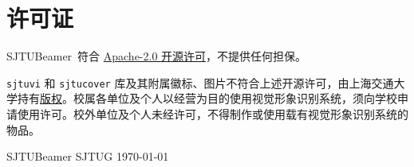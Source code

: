 \documentclass[
    UTF8,
    heading=true,
    12pt,
    a4paper
]{ctexrep}
\def\themename{\textsf{SJTUBeamer}}
\begin{document}
\chapter*{许可证}

\themename\ 符合 \href{https://github.com/sjtug/SJTUBeamer/blob/main/LICENSE}{Apache-2.0 开源许可}，不提供任何担保。

\texttt{sjtuvi} 和 \texttt{sjtucover} 库及其附属徽标、图片不符合上述开源许可，由上海交通大学持有\href{https://vi.sjtu.edu.cn/index.php/articles/bulletin/16}{版权}。校属各单位及个人以经营为目的使用视觉形象识别系统，须向学校申请使用许可。校外单位及个人未经许可，不得制作或使用载有视觉形象识别系统的物品。

\vfill

{\small \themename{} \hfill  SJTUG  \hfill \today}
\end{document}
